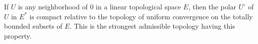 If $U$ is any neighborhood of $0$ in a linear topological space $E$, then the polar $U^\circ$ of $U$ in $E^*$ is compact relative to the topology of uniform convergence on the totally bounded subsets of $E$. This is the strongest admissible topology having this property.
